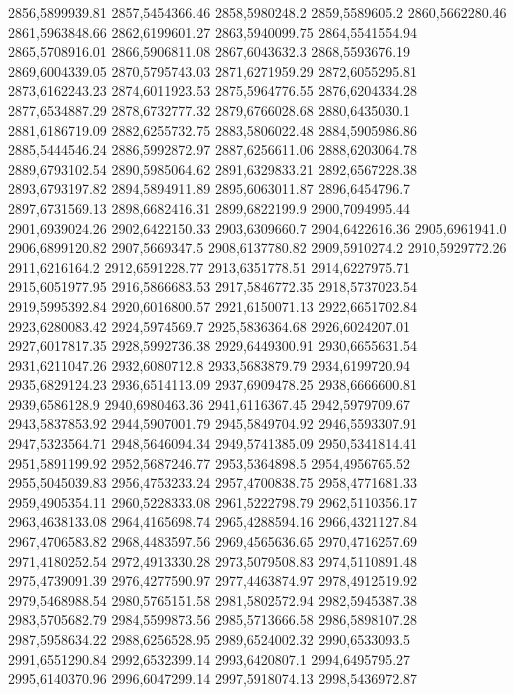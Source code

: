 2856,5899939.81
2857,5454366.46
2858,5980248.2
2859,5589605.2
2860,5662280.46
2861,5963848.66
2862,6199601.27
2863,5940099.75
2864,5541554.94
2865,5708916.01
2866,5906811.08
2867,6043632.3
2868,5593676.19
2869,6004339.05
2870,5795743.03
2871,6271959.29
2872,6055295.81
2873,6162243.23
2874,6011923.53
2875,5964776.55
2876,6204334.28
2877,6534887.29
2878,6732777.32
2879,6766028.68
2880,6435030.1
2881,6186719.09
2882,6255732.75
2883,5806022.48
2884,5905986.86
2885,5444546.24
2886,5992872.97
2887,6256611.06
2888,6203064.78
2889,6793102.54
2890,5985064.62
2891,6329833.21
2892,6567228.38
2893,6793197.82
2894,5894911.89
2895,6063011.87
2896,6454796.7
2897,6731569.13
2898,6682416.31
2899,6822199.9
2900,7094995.44
2901,6939024.26
2902,6422150.33
2903,6309660.7
2904,6422616.36
2905,6961941.0
2906,6899120.82
2907,5669347.5
2908,6137780.82
2909,5910274.2
2910,5929772.26
2911,6216164.2
2912,6591228.77
2913,6351778.51
2914,6227975.71
2915,6051977.95
2916,5866683.53
2917,5846772.35
2918,5737023.54
2919,5995392.84
2920,6016800.57
2921,6150071.13
2922,6651702.84
2923,6280083.42
2924,5974569.7
2925,5836364.68
2926,6024207.01
2927,6017817.35
2928,5992736.38
2929,6449300.91
2930,6655631.54
2931,6211047.26
2932,6080712.8
2933,5683879.79
2934,6199720.94
2935,6829124.23
2936,6514113.09
2937,6909478.25
2938,6666600.81
2939,6586128.9
2940,6980463.36
2941,6116367.45
2942,5979709.67
2943,5837853.92
2944,5907001.79
2945,5849704.92
2946,5593307.91
2947,5323564.71
2948,5646094.34
2949,5741385.09
2950,5341814.41
2951,5891199.92
2952,5687246.77
2953,5364898.5
2954,4956765.52
2955,5045039.83
2956,4753233.24
2957,4700838.75
2958,4771681.33
2959,4905354.11
2960,5228333.08
2961,5222798.79
2962,5110356.17
2963,4638133.08
2964,4165698.74
2965,4288594.16
2966,4321127.84
2967,4706583.82
2968,4483597.56
2969,4565636.65
2970,4716257.69
2971,4180252.54
2972,4913330.28
2973,5079508.83
2974,5110891.48
2975,4739091.39
2976,4277590.97
2977,4463874.97
2978,4912519.92
2979,5468988.54
2980,5765151.58
2981,5802572.94
2982,5945387.38
2983,5705682.79
2984,5599873.56
2985,5713666.58
2986,5898107.28
2987,5958634.22
2988,6256528.95
2989,6524002.32
2990,6533093.5
2991,6551290.84
2992,6532399.14
2993,6420807.1
2994,6495795.27
2995,6140370.96
2996,6047299.14
2997,5918074.13
2998,5436972.87
